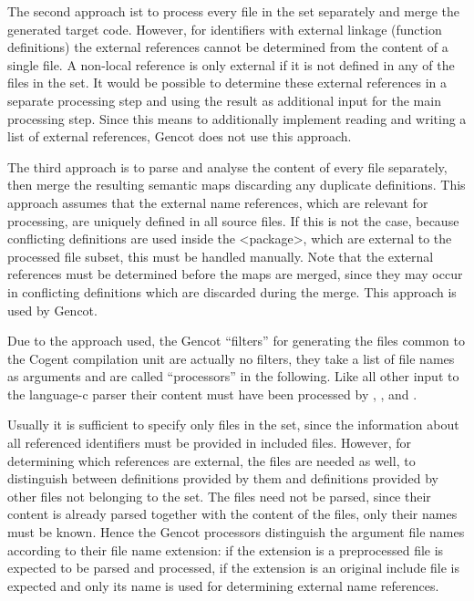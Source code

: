 The second approach ist to process every file in the set separately and merge the generated target code. However, for
identifiers with external linkage (function definitions) the external references cannot be determined from the content
of a single file. A non-local reference is only external if it is not defined in any of the files in the set. It would
be possible to determine these external references in a separate processing step and using the result as additional input
for the main processing step. Since this means to additionally implement reading and writing a list of external references,
Gencot does not use this approach.

The third approach is to parse and analyse the content of every file separately, then merge the resulting semantic maps
discarding any duplicate definitions. This approach assumes that the external name references, which are relevant for
processing, are uniquely defined in all source files. If this is not the case, because conflicting definitions are used
inside the <package>, which are external to the processed file subset, this must be handled manually. Note that the
external references must be determined before the maps are merged, since they may occur in conflicting definitions
which are discarded during the merge. This approach is used by Gencot.

Due to the approach used, the Gencot ``filters'' for generating the files common to the Cogent compilation unit are
actually no filters, they take a list of file names as arguments and are called ``processors'' in the following.
Like all other input to the language-c parser their
content must have been processed by , , and .

Usually it is sufficient to specify only  files in the set, since the information about all referenced 
identifiers must be provided in included  files. However, for determining which references are external, the
 files are needed as well, to distinguish between definitions provided by them and definitions provided
by other  files not belonging to the set. The  files need not be parsed, since their content is
already parsed together with the content of the  files, only their names must be known. Hence the Gencot
processors distinguish the argument file names according to their file name extension: if the extension is 
 a preprocessed  file is expected to be parsed and processed, if the extension is 
an original include file is expected and only its name is used for determining external name references.

